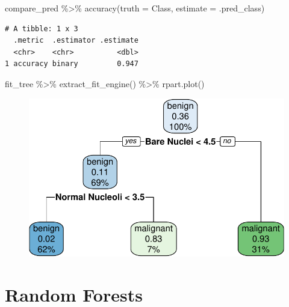 \documentclass[
  letterpaper,
  DIV=11,
  numbers=noendperiod]{scrreprt}
\newenvironment{Shaded}{\begin{snugshade}}{\end{snugshade}}
\newcommand{\AttributeTok}[1]{\textcolor[rgb]{0.40,0.45,0.13}{#1}}
\newcommand{\FunctionTok}[1]{\textcolor[rgb]{0.28,0.35,0.67}{#1}}
\newcommand{\NormalTok}[1]{\textcolor[rgb]{0.00,0.23,0.31}{#1}}
\newcommand{\SpecialCharTok}[1]{\textcolor[rgb]{0.37,0.37,0.37}{#1}}
\begin{document}
\begin{Shaded}
\begin{Highlighting}[]
\NormalTok{compare\_pred }\SpecialCharTok{\%\textgreater{}\%}  \FunctionTok{accuracy}\NormalTok{(}\AttributeTok{truth =}\NormalTok{ Class, }\AttributeTok{estimate =}\NormalTok{ .pred\_class)}
\end{Highlighting}
\end{Shaded}

\begin{verbatim}
# A tibble: 1 x 3
  .metric  .estimator .estimate
  <chr>    <chr>          <dbl>
1 accuracy binary         0.947
\end{verbatim}

\begin{Shaded}
\begin{Highlighting}[]
\NormalTok{fit\_tree }\SpecialCharTok{\%\textgreater{}\%}
  \FunctionTok{extract\_fit\_engine}\NormalTok{() }\SpecialCharTok{\%\textgreater{}\%}
  \FunctionTok{rpart.plot}\NormalTok{()}
\end{Highlighting}
\end{Shaded}

\begin{figure}[H]

{\centering \includegraphics{./14-machine-learning_files/figure-pdf/unnamed-chunk-13-1.pdf}

}

\end{figure}

\hypertarget{random-forests}{%
\section{Random Forests}\label{random-forests}}
\end{document}
